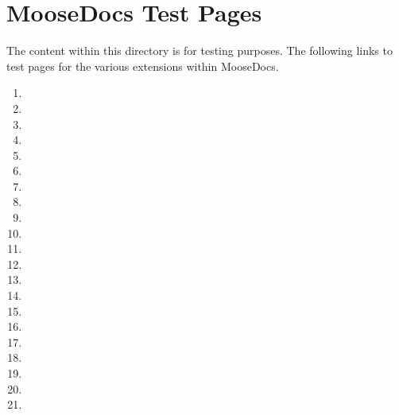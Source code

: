 
\chapter{\label{moosedocs-test-pages}MooseDocs Test Pages}
\par The content within this directory is for testing purposes. The following links to test pages for the various extensions within MooseDocs.
\begin{enumerate}
\item
\par  \item
\par  \item
\par  \item
\par  \item
\par  \item
\par  \item
\par  \item
\par  \item
\par  \item
\par  \item
\par  \item
\par  \item
\par  \item
\par  \item
\par  \item
\par  \item
\par  \item
\par  \item
\par  \item
\par  \item
\par 
\end{enumerate}